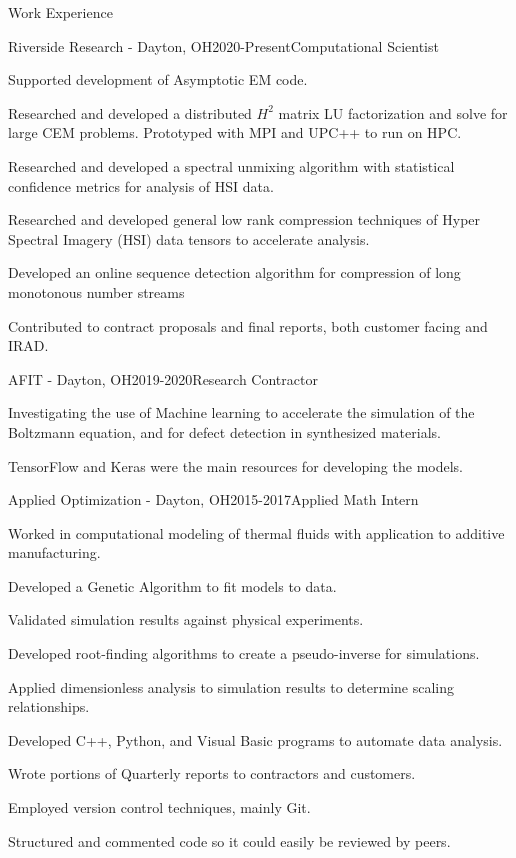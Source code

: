 \documentclass{resume} %
\begin{document}
\begin{rSection}{Work Experience}

\begin{rSubsection}{Riverside Research - Dayton, OH}{2020-Present}{Computational Scientist}{}
\item Supported development of Asymptotic EM code.
\item Researched and developed a distributed $H^2$ matrix LU factorization and solve for large CEM problems. Prototyped with MPI and UPC++ to run on HPC.
\item Researched and developed a spectral unmixing algorithm with statistical confidence metrics for analysis of HSI data.
\item Researched and developed general low rank compression techniques of Hyper Spectral Imagery (HSI) data tensors to accelerate analysis.
\item Developed an online sequence detection algorithm for compression of long monotonous number streams
\item Contributed to contract proposals and final reports, both customer facing and IRAD.
\end{rSubsection}

\begin{rSubsection}{AFIT - Dayton, OH}{2019-2020}{Research Contractor}{}
\item Investigating the use of Machine learning to accelerate the simulation of the Boltzmann equation, and for defect detection in synthesized materials. 
\item TensorFlow and Keras were the main resources for developing the models.
\end{rSubsection}

\begin{rSubsection}{Applied Optimization - Dayton, OH}{2015-2017}{Applied Math Intern}{}
\item Worked in computational modeling of thermal fluids with application to additive manufacturing.
\item Developed a Genetic Algorithm to fit models to data.
\item Validated simulation results against physical experiments.
\item Developed root-finding algorithms to create a pseudo-inverse for simulations.
\item Applied dimensionless analysis to simulation results to determine scaling relationships.
\item Developed C++, Python, and Visual Basic programs to automate data analysis.
\item Wrote portions of Quarterly reports to contractors and customers.
\item Employed version control techniques, mainly Git.
\item Structured and commented code so it could easily be reviewed by peers.
\end{rSubsection}


\end{rSection}
\end{document}
